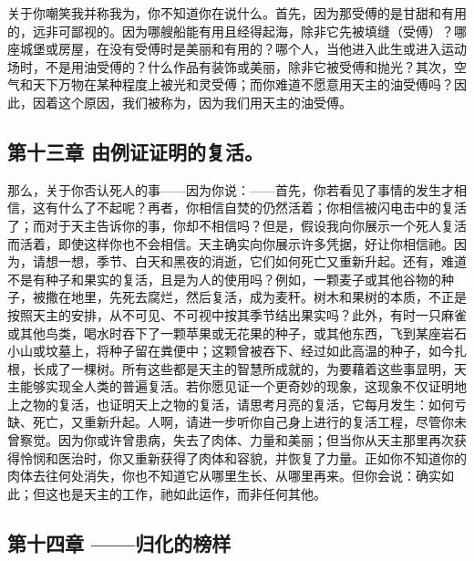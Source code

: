 关于你嘲笑我并称我为，你不知道你在说什么。首先，因为那受傅的是甘甜和有用的，远非可鄙视的。因为哪艘船能有用且经得起海，除非它先被填缝（受傅）？哪座城堡或房屋，在没有受傅时是美丽和有用的？哪个人，当他进入此生或进入运动场时，不是用油受傅的？什么作品有装饰或美丽，除非它被受傅和抛光？其次，空气和天下万物在某种程度上被光和灵受傅；而你难道不愿意用天主的油受傅吗？因此，因着这个原因，我们被称为，因为我们用天主的油受傅。\par


\subsection{第十三章 由例证证明的复活。}

那么，关于你否认死人的事——因为你说：——首先，你若看见了事情的发生才相信，这有什么了不起呢？再者，你相信自焚的仍然活着；你相信被闪电击中的复活了；而对于天主告诉你的事，你却不相信吗？但是，假设我向你展示一个死人复活而活着，即使这样你也不会相信。天主确实向你展示许多凭据，好让你相信祂。因为，请想一想，季节、白天和黑夜的消逝，它们如何死亡又重新升起。还有，难道不是有种子和果实的复活，且是为人的使用吗？例如，一颗麦子或其他谷物的种子，被撒在地里，先死去腐烂，然后复活，成为麦秆。树木和果树的本质，不正是按照天主的安排，从不可见、不可视中按其季节结出果实吗？此外，有时一只麻雀或其他鸟类，喝水时吞下了一颗苹果或无花果的种子，或其他东西，飞到某座岩石小山或坟墓上，将种子留在粪便中；这颗曾被吞下、经过如此高温的种子，如今扎根，长成了一棵树。所有这些都是天主的智慧所成就的，为要藉着这些事显明，天主能够实现全人类的普遍复活。若你愿见证一个更奇妙的现象，这现象不仅证明地上之物的复活，也证明天上之物的复活，请思考月亮的复活，它每月发生：如何亏缺、死亡，又重新升起。人啊，请进一步听你自己身上进行的复活工程，尽管你未曾察觉。因为你或许曾患病，失去了肉体、力量和美丽；但当你从天主那里再次获得怜悯和医治时，你又重新获得了肉体和容貌，并恢复了力量。正如你不知道你的肉体去往何处消失，你也不知道它从哪里生长、从哪里再来。但你会说：确实如此；但这也是天主的工作，祂如此运作，而非任何其他。\par


\subsection{第十四章 ——归化的榜样}

